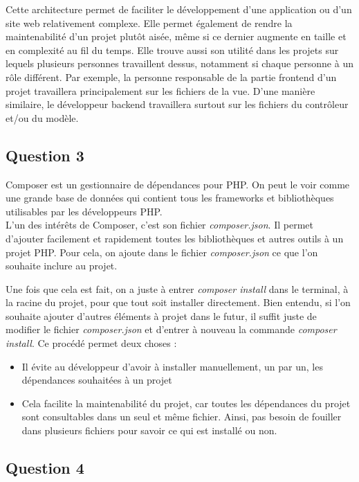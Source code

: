 \documentclass[12pt,a4paper]{article}
\begin{document}
	Cette architecture permet de faciliter le développement d'une application ou d'un site web relativement complexe. Elle permet également de rendre la maintenabilité d'un projet plutôt aisée, même si ce dernier augmente en taille et en complexité au fil du temps.
	Elle trouve aussi son utilité dans les projets sur lequels plusieurs personnes travaillent dessus, notamment si chaque personne à un rôle différent. Par exemple, la personne responsable de la partie frontend d'un projet travaillera principalement sur les fichiers de la vue. D'une manière similaire, le développeur backend travaillera surtout sur les fichiers du contrôleur et/ou du modèle.

	 \subsection*{Question 3}
	 
	 Composer est un gestionnaire de dépendances pour PHP. On peut le voir comme une grande base de données qui contient tous les frameworks et bibliothèques utilisables par les développeurs PHP. \\
	 L'un des intérêts de Composer, c'est son fichier \textit{composer.json}. Il permet d'ajouter facilement et rapidement toutes les bibliothèques et autres outils à un projet PHP. Pour cela, on ajoute dans le fichier \textit{composer.json} ce que l'on souhaite inclure au projet.
	 
	 Une fois que cela est fait, on a juste à entrer \textit{composer install} dans le terminal, à la racine du projet, pour que tout soit installer directement. Bien entendu, si l'on souhaite ajouter d'autres éléments à projet dans le futur, il suffit juste de modifier le fichier \textit{composer.json} et d'entrer à nouveau la commande \textit{composer install}. Ce procédé permet deux choses : \\
	 \begin{itemize}
	 	\item Il évite au développeur d'avoir à installer manuellement, un par un, les dépendances souhaitées à un projet
	 	\item Cela facilite la maintenabilité du projet, car toutes les dépendances du projet sont consultables dans un seul et même fichier. Ainsi, pas besoin de fouiller dans plusieurs fichiers pour savoir ce qui est installé ou non.
	 \end{itemize}
	
	
	 \subsection*{Question 4}
\end{document}

